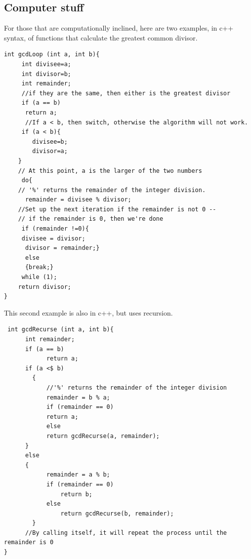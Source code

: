 \subsection{Computer stuff}
For those that are computationally inclined, here are two examples, in c++ syntax, of functions that calculate the greatest common divisor.

\begin{verbatim}
int gcdLoop (int a, int b){
	 int divisee=a;
	 int divisor=b;
	 int remainder;
	 //if they are the same, then either is the greatest divisor
	 if (a == b)
	  return a;
	  //If a < b, then switch, otherwise the algorithm will not work.
	 if (a < b){
		divisee=b;
		divisor=a;
	}
	// At this point, a is the larger of the two numbers
	 do{
	// '%' returns the remainder of the integer division.
	  remainder = divisee % divisor;
	//Set up the next iteration if the remainder is not 0 -- 
	// if the remainder is 0, then we're done
	 if (remainder !=0){
	 divisee = divisor;
	  divisor = remainder;}
	  else
	  {break;}
	 while (1);
	return divisor;
}
\end{verbatim}

This second example is also in c++, but uses recursion.

\begin{verbatim}
 int gcdRecurse (int a, int b){ 
	  int remainder; 
	  if (a == b) 
	    	return a; 
	  if (a <$ b) 
	    { 
	    	//'%' returns the remainder of the integer division 
	    	remainder = b % a; 
	    	if (remainder == 0) 
	      	return a; 
	    	else 
	      	return gcdRecurse(a, remainder);  
	  }  
	  else 
	  { 
	    	remainder = a % b; 
	    	if (remainder == 0) 
	      		return b; 
	    	else 
	      		return gcdRecurse(b, remainder); 
	    } 	
	  //By calling itself, it will repeat the process until the remainder is 0 
} 
\end{verbatim}

